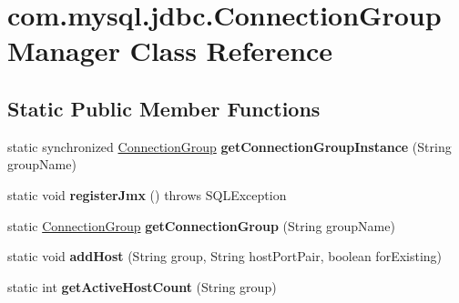 \hypertarget{classcom_1_1mysql_1_1jdbc_1_1_connection_group_manager}{}\section{com.\+mysql.\+jdbc.\+Connection\+Group\+Manager Class Reference}
\label{classcom_1_1mysql_1_1jdbc_1_1_connection_group_manager}
\subsection*{Static Public Member Functions}
\begin{DoxyCompactItemize}
\item 
\mbox{\label{classcom_1_1mysql_1_1jdbc_1_1_connection_group_manager_ac376a8746c3dd1ef4b680cdf4d45c027}} 
static synchronized \mbox{\hyperlink{classcom_1_1mysql_1_1jdbc_1_1_connection_group}{Connection\+Group}} {\bfseries get\+Connection\+Group\+Instance} (String group\+Name)
\item 
\mbox{\label{classcom_1_1mysql_1_1jdbc_1_1_connection_group_manager_a274107c7e240797776be56ce32507727}} 
static void {\bfseries register\+Jmx} ()  throws S\+Q\+L\+Exception 
\item 
\mbox{\label{classcom_1_1mysql_1_1jdbc_1_1_connection_group_manager_a42c2a7e2dc966a4ddf81315a7480f87b}} 
static \mbox{\hyperlink{classcom_1_1mysql_1_1jdbc_1_1_connection_group}{Connection\+Group}} {\bfseries get\+Connection\+Group} (String group\+Name)
\item 
\mbox{\label{classcom_1_1mysql_1_1jdbc_1_1_connection_group_manager_a68e241ef3df3ab756df627e591b93d28}} 
static void {\bfseries add\+Host} (String group, String host\+Port\+Pair, boolean for\+Existing)
\item 
\mbox{\label{classcom_1_1mysql_1_1jdbc_1_1_connection_group_manager_a48e2dddbdd6419019ea66a148e75a9b9}} 
static int {\bfseries get\+Active\+Host\+Count} (String group)
\item 

\end{DoxyCompactItemize}
